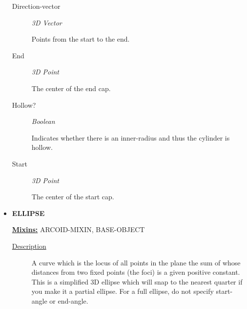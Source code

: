 \documentclass [11pt]{book}
\begin{document}
\begin{itemize}
\begin{description}
\item [Direction-vector]
\emph{3D Vector}

 Points from the start to the end.




\item [End]
\emph{3D Point}

 The center of the end cap.




\item [Hollow?]
\emph{Boolean}

 Indicates whether there is an inner-radius and thus the cylinder is hollow.




\item [Start]
\emph{3D Point}

 The center of the start cap.




\end{description}







\item {}
\label{prim:ellipse}
\textbf{ELLIPSE}


\textbf{
\underline{Mixins:}} ARCOID-MIXIN, BASE-OBJECT





\begin{description}

\item [
\underline{Description}]


A curve which is the locus of all points in the plane 
the sum of whose distances from two fixed points (the foci) is a given positive constant.
This is a simplified 3D ellipse which will snap to the nearest quarter if you make it a 
partial ellipse. For a full ellipse, do not specify start-angle or end-angle.



\end{description}




\begin{figure}
\begin{lrbox}{\boxedverb}
\begin{minipage}{\linewidth}
{\small

}
\end{minipage}
\end{lrbox}
\end{figure}
\end{itemize}
\end{document}
